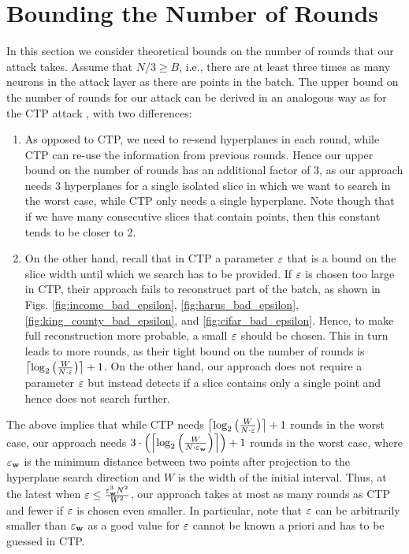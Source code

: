 \section{Bounding the Number of Rounds}\label{app:vgia_bound}

In this section we consider theoretical bounds on the number of rounds that our attack takes.
Assume that $N/3 \geq B$, i.e., there are at least three times as many neurons in the attack layer as there are points in the batch.
The upper bound on the number of rounds for our attack can be derived in an analogous way as for the CTP attack \cite[Appendix D]{ctp_paper}, with two differences:
\begin{enumerate}
    \item As opposed to CTP, we need to re-send hyperplanes in each round, while CTP can re-use the information from previous rounds.
    Hence our upper bound on the number of rounds has an additional factor of 3, as our approach needs 3 hyperplanes for a single isolated slice in which we want to search in the worst case, while CTP only needs a single hyperplane.
    Note though that if we have many consecutive slices that contain points, then this constant tends to be closer to 2.
    \item On the other hand, recall that in CTP a parameter $\varepsilon$ that is a bound on the slice width until which we search has to be provided.
    If $\varepsilon$ is chosen too large in CTP, their approach fails to reconstruct part of the batch, as shown in Figs. \ref{fig:income_bad_epsilon}, \ref{fig:harus_bad_epsilon}, \ref {fig:king_county_bad_epsilon}, and \ref {fig:cifar_bad_epsilon}.
    Hence, to make full reconstruction more probable, a small $\varepsilon$ should be chosen.
    This in turn leads to more rounds, as their tight bound on the number of rounds is $\left\lceil \log_2 \left(\frac{W}{N \cdot \varepsilon}\right) \right\rceil + 1$.
    On the other hand, our approach does not require a parameter $\varepsilon$ but instead detects if a slice contains only a single point and hence does not search further.
\end{enumerate}

The above implies that while CTP needs $\left\lceil \log_2 \left(\frac{W}{N \cdot \varepsilon}\right) \right\rceil + 1$ rounds in the worst case, our approach needs $3 \cdot \left(\left\lceil \log_2 \left(\frac{W}{N \cdot \varepsilon_{\mathbf w}}\right) \right\rceil \right) + 1$ rounds in the worst case, where $\varepsilon_{\mathbf w}$ is the minimum distance between two points after projection to the hyperplane search direction and $W$ is the width of the initial interval.
Thus, at the latest when $\varepsilon \leq \frac{\varepsilon_{\mathbf w}^3 N^2}{W^2}$, our approach takes at most as many rounds as CTP and fewer if $\varepsilon$ is chosen even smaller.
In particular, note that $\varepsilon$ can be arbitrarily smaller than $\varepsilon_{\mathbf w}$ as a good value for $\varepsilon$ cannot be known a priori and has to be guessed in CTP.

